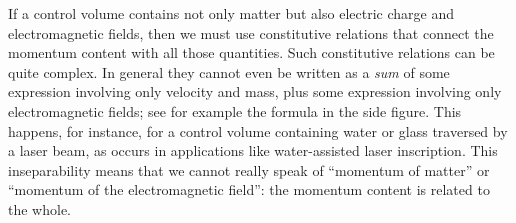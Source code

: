 \documentclass[a4paper,12pt,%
onecolumn,oneside,%
british%
]{memoir}
\renewcommand*{\bm}[1]{\textpdfrender{TextRenderingMode=2,LineWidth=0.2pt}{\boldsymbol{#1}}}
\renewcommand*{\|}[1][]{\nonscript\:#1\vert\nonscript\:\mathopen{}}
\newcommand*{\sect}{\S}%
\renewcommand*{\autoref}[3][\sect\,\ref]{\textcolor{blue}{#3} {\color{blue}\scriptsize(\faIcon[regular]{eye}\;#1{#2}\;p.\,\pageref{#2})}}
\newcommand*{\yN}{N}
\newcommand*{\yrho}{\rho}
\newcommand*{\ym}{m}%
\newcommand*{\yP}{\bm{P}}
\begin{document}
If a control volume contains not only matter but also electric charge and electromagnetic fields, then we must use constitutive relations that connect the momentum content with all those quantities. Such constitutive relations can be quite complex. In general they cannot even be written as a \emph{sum} of some expression involving only velocity and mass, plus some expression involving only electromagnetic fields; see for example the formula in the side figure.
%
%
This happens, for instance, for a control volume containing water or glass traversed by a laser beam, as occurs in applications like water-assisted laser inscription. This inseparability means that we cannot really speak of \enquote{momentum of matter} or \enquote{momentum of the electromagnetic field}: the momentum content is related to the whole.

% 
%
\end{document}
